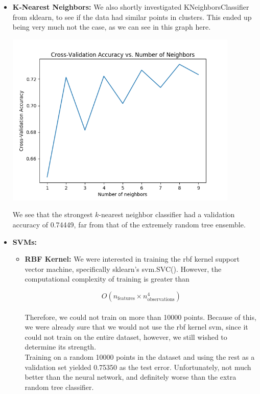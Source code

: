\begin{itemize}
\begin{itemize}
    \item \textbf{K-Nearest Neighbors:}
        We also shortly investigated KNeighborsClassifier from sklearn, to see
        if the data had similar points in clusters. This ended up being
        very much not the case, as we can see in this graph here.
        \begin{center}
            \includegraphics[width=30em]{figure_5.png}
        \end{center}
        We see that the strongest $k$-nearest neighbor classifier had a
        validation accuracy of 0.74449, far from that of the extremely
        random tree ensemble.

    \pagebreak

    \item \textbf{SVMs:}
        \begin{itemize}
            \item \textbf{RBF Kernel:}
            We were interested in training the rbf kernel support vector machine,
            specifically sklearn's svm.SVC(). However, the computational complexity
            of training is greater than

            $$O(n_\text{features} \times n_\text{observations}^4)$$\\

            Therefore, we could not train on more than 10000 points. Because of
            this, we were already sure that we would not use the rbf kernel
            svm, since it could not train on the entire dataset, however, we
            still wished to determine its strength. \\

            Training on
            a random 10000 points in the dataset and using the rest as a validation
            set yielded 0.75350 as the test error. Unfortunately, not much better
            than the neural network, and definitely worse than the extra random
            tree classifier.\\


\end{itemize}
\end{itemize}
\end{itemize}
